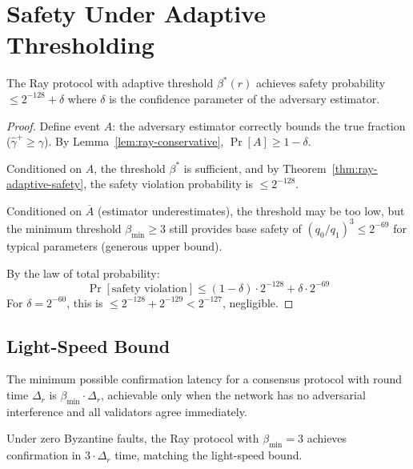 \section{Safety Under Adaptive Thresholding}

\label{sec:ray-safety}

\begin{theorem}
\label{thm:ray-ray-safety}
The Ray protocol with adaptive threshold $\beta^*(r)$ achieves safety probability
$\leq 2^{-128} + \delta$ where $\delta$ is the confidence parameter of the adversary
estimator.
\end{theorem}

\begin{proof}
Define event $A$: the adversary estimator correctly bounds the true fraction
($\hat{\gamma}^+ \geq \gamma$). By Lemma~\ref{lem:ray-conservative}, $\Pr[A] \geq 1 - \delta$.

Conditioned on $A$, the threshold $\beta^*$ is sufficient, and by Theorem~\ref{thm:ray-adaptive-safety},
the safety violation probability is $\leq 2^{-128}$.

Conditioned on $\overline{A}$ (estimator underestimates), the threshold may be too low,
but the minimum threshold $\beta_{\min} \geq 3$ still provides base safety of
$(q_0/q_1)^3 \leq 2^{-69}$ for typical parameters (generous upper bound).

By the law of total probability:
\[
\Pr[\text{safety violation}] \leq (1 - \delta) \cdot 2^{-128} + \delta \cdot 2^{-69}
\]
For $\delta = 2^{-60}$, this is $\leq 2^{-128} + 2^{-129} < 2^{-127}$, negligible.
\end{proof}

\subsection{Light-Speed Bound}

\begin{definition}
The minimum possible confirmation latency for a consensus protocol with round time
$\Delta_r$ is $\beta_{\min} \cdot \Delta_r$, achievable only when the network has no
adversarial interference and all validators agree immediately.
\end{definition}

\begin{proposition}
\label{prop:lightspeed}
Under zero Byzantine faults, the Ray protocol with $\beta_{\min} = 3$ achieves
confirmation in $3 \cdot \Delta_r$ time, matching the light-speed bound.
\end{proposition}

